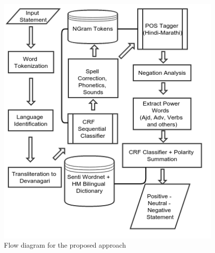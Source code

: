 \documentclass[12pt]{book}
\begin{document}
\begin{figure}[ht!]
    \includegraphics[width=140mm]{polarity-pickup.png}
    \caption{Flow diagram for the proposed approach}
\end{figure}
\end{document}

